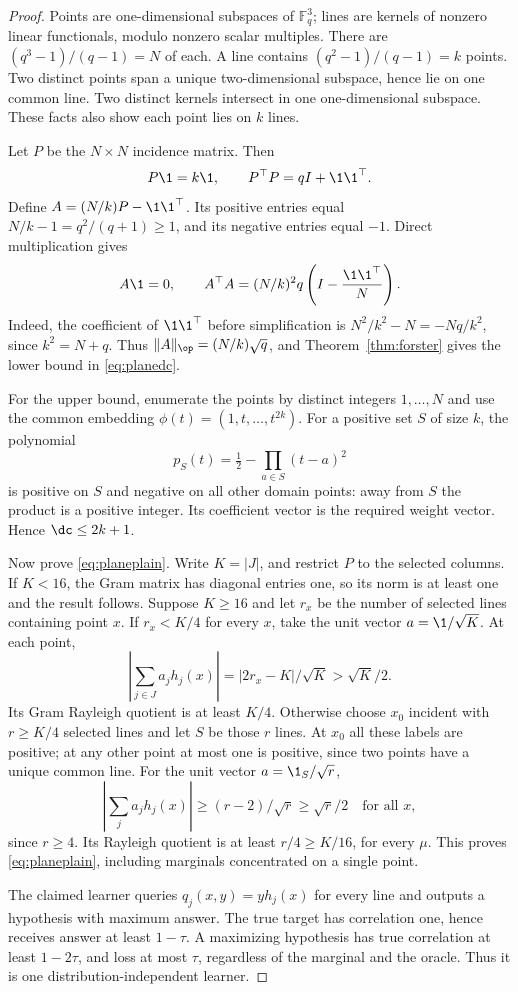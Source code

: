 \begin{proof}
Points are one-dimensional subspaces of $\mathbb F_q^3$; lines are kernels of nonzero linear functionals, modulo nonzero scalar multiples. There are $(q^3-1)/(q-1)=N$ of each. A line contains $(q^2-1)/(q-1)=k$ points. Two distinct points span a unique two-dimensional subspace, hence lie on one common line. Two distinct kernels intersect in one one-dimensional subspace. These facts also show each point lies on $k$ lines.

Let $P$ be the $N\times N$ incidence matrix. Then
\[
 P\1=k\1,\qquad P^\top P=qI+\1\1^\top.
\]
Define $A=(N/k)P-\1\1^\top$. Its positive entries equal $N/k-1=q^2/(q+1)\geq1$, and its negative entries equal $-1$. Direct multiplication gives
\[
 A\1=0,\qquad
 A^\top A=(N/k)^2q\left(I-\frac{\1\1^\top}{N}\right).
\]
Indeed, the coefficient of $\1\1^\top$ before simplification is $N^2/k^2-N=-Nq/k^2$, since $k^2=N+q$. Thus $\|A\|_\op=(N/k)\sqrt q$, and Theorem~\ref{thm:forster} gives the lower bound in \eqref{eq:planedc}.

For the upper bound, enumerate the points by distinct integers $1,\ldots,N$ and use the common embedding
$\phi(t)=(1,t,\ldots,t^{2k})$. For a positive set $S$ of size $k$, the polynomial
\[
 p_S(t)=\tfrac12-\prod_{a\in S}(t-a)^2
\]
is positive on $S$ and negative on all other domain points: away from $S$ the product is a positive integer. Its coefficient vector is the required weight vector. Hence $\dc\leq2k+1$.

Now prove \eqref{eq:planeplain}. Write $K=|J|$, and restrict $P$ to the selected columns. If $K<16$, the Gram matrix has diagonal entries one, so its norm is at least one and the result follows. Suppose $K\geq16$ and let $r_x$ be the number of selected lines containing point $x$.
If $r_x<K/4$ for every $x$, take the unit vector $a=\1/\sqrt K$. At each point,
\[
 |\textstyle\sum_{j\in J}a_jh_j(x)|=|2r_x-K|/\sqrt K>\sqrt K/2.
\]
Its Gram Rayleigh quotient is at least $K/4$. Otherwise choose $x_0$ incident with $r\geq K/4$ selected lines and let $S$ be those $r$ lines. At $x_0$ all these labels are positive; at any other point at most one is positive, since two points have a unique common line. For the unit vector $a=\1_S/\sqrt r$,
\[
 |\textstyle\sum_j a_jh_j(x)|\geq(r-2)/\sqrt r\geq\sqrt r/2
 \quad\text{for all }x,
\]
since $r\geq4$. Its Rayleigh quotient is at least $r/4\geq K/16$, for every $\mu$. This proves \eqref{eq:planeplain}, including marginals concentrated on a single point.

The claimed learner queries $q_j(x,y)=y h_j(x)$ for every line and outputs a hypothesis with maximum answer. The true target has correlation one, hence receives answer at least $1-\tau$. A maximizing hypothesis has true correlation at least $1-2\tau$, and loss at most $\tau$, regardless of the marginal and the oracle. Thus it is one distribution-independent learner.


\end{proof}
